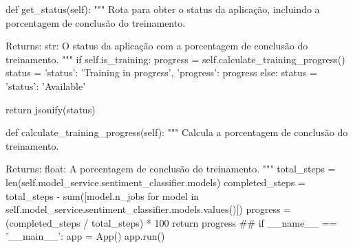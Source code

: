 \begin{codigo}[caption={API para engine de classificação de sentimento baseado em NLP utilizando o Flask como middleware http}, label={codigo:sentiment_api}, language=Python, breaklines=true]
    def get_status(self):
        """
        Rota para obter o status da aplicação, incluindo a porcentagem de conclusão do treinamento.

        Returns:
            str: O status da aplicação com a porcentagem de conclusão do treinamento.
        """
        if self.is_training:
            progress = self.calculate_training_progress()
            status = {'status': 'Training in progress', 'progress': progress}
        else:
            status = {'status': 'Available'}

        return jsonify(status)

    def calculate_training_progress(self):
        """
        Calcula a porcentagem de conclusão do treinamento.

        Returns:
            float: A porcentagem de conclusão do treinamento.
        """
        total_steps = len(self.model_service.sentiment_classifier.models)
        completed_steps = total_steps - sum([model.n_jobs for model in self.model_service.sentiment_classifier.models.values()])
        progress = (completed_steps / total_steps) * 100
        return progress
##
if __name__ == '__main__':
    app = App()
    app.run()
\end{codigo}